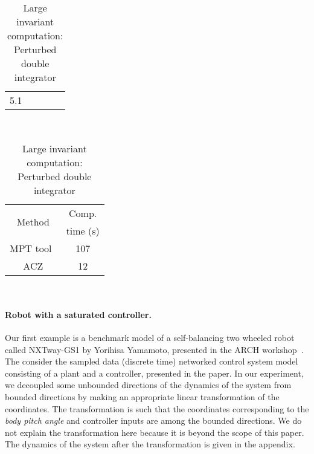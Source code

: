 \begin{table}
\begin{minipage}{0.45\textwidth}
\begin{tabular}{|l|c|c|c|c|}
\multirow{2}{*}{5.1}\\
\multicolumn{2}{|c|}{} & & &\\
\hline
\end{tabular}
\caption{Small invariant computation:\newline Perturbed double
  integrator}
~\label{tab:smallinv-pdi}
\end{minipage}
\hspace{4em}
\begin{minipage}{0.4\textwidth}
\begin{tabular}{|c|c|}
\hline
\multirow{2}{*}{Method} & Comp.\\
& time (s)\\
\hline
\multirow{2}{*}{MPT tool~\cite{rakovic2004computation}} & \multirow{2}{*}{107}\\
& \\
\hline
\multirow{2}{*}{ACZ} & \multirow{2}{*}{12}\\
& \\
\hline
\end{tabular}
\caption{Large invariant computation: Perturbed double integrator}
~\label{tab:largeinv-pdi}
\end{minipage}
\vspace{-5em}
\end{table}

\paragraph{Robot with a saturated controller.}  Our first example is a benchmark
model of a self-balancing two wheeled robot called NXTway-GS1 by
Yorihisa Yamamoto, presented in the ARCH
workshop~\cite{heinz2014benchmark}. The consider the sampled data
(discrete time) networked control system model consisting of a plant
and a controller, presented in the paper. In our experiment, we
decoupled some unbounded directions of the dynamics of the system from
bounded directions by making an appropriate linear transformation of
the coordinates.  The transformation is such that the coordinates
corresponding to the \emph{body pitch angle} and controller inputs are
among the bounded directions.  We do not explain the transformation
here because it is beyond the scope of this paper.  The dynamics of
the system after the transformation is given in the appendix.  
%


